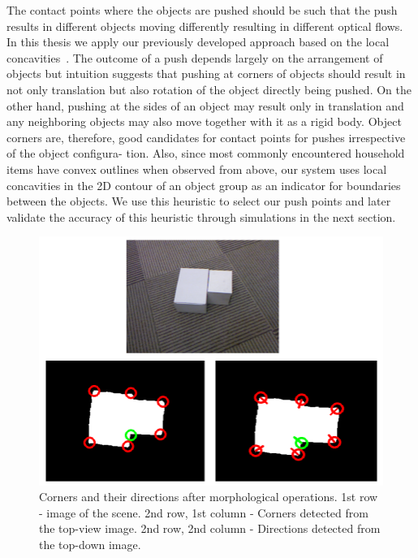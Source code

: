 The contact points where the objects are pushed should
be such that the push results in different objects moving
differently resulting in different optical flows.
In  this thesis we apply our previously developed approach based on 
the local concavities~\cite{bersch12interactive}. The outcome
of a push depends largely on the arrangement of objects but
intuition suggests that pushing at corners of objects should
result in not only translation but also rotation of the object
directly being pushed. On the other hand, pushing at the
sides of an object may result only in translation and any
neighboring objects may also move together with it as a
rigid body. Object corners are, therefore, good candidates for
contact points for pushes irrespective of the object configura-
tion. Also, since most
commonly  encountered  household   items  have  convex  outlines  when
observed  from  above,  our  system  uses  local
concavities in the  2D contour of an object group  as an indicator for
boundaries between the objects.
We use this heuristic to select our push points and later
validate the accuracy of this heuristic through simulations in
the next section.

\begin{figure}[tb!]
   \begin{center}
     \includegraphics[width=.9\columnwidth]{figures/corners.png}
		\vspace{-2ex}
   \caption{Corners and their directions after morphological operations. 1st row - image of the scene. 2nd row, 1st column - Corners detected from the top-view image. 2nd row, 2nd column - Directions detected from the top-down image. }
   \label{fig:corners}
 \end{center}
 \end{figure}

